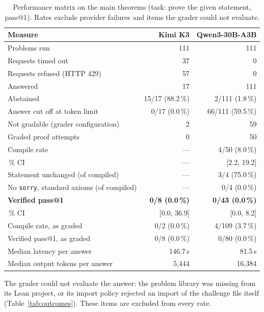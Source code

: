\documentclass[11pt]{article}
\begin{document}
\begin{table}[!htbp]
\centering
\begin{threeparttable}
\caption{Performance matrix on the main theorems (task: prove the given statement, pass@1). Rates exclude provider failures and items the grader could not evaluate.}
\label{tab:matrix}
\small
\begin{tabular}{@{}lrr@{}}
\toprule
Measure & Kimi K3 & Qwen3-30B-A3B \\
\midrule
Problems run & 111 & 111 \\
Requests timed out & 37 & 0 \\
Requests refused (HTTP 429) & 57 & 0 \\
Answered & 17 & 111 \\
Abstained\tnote{b} & 15/17 (88.2\,\%) & 2/111 (1.8\,\%) \\
Answer cut off at token limit & 0/17 (0.0\,\%) & 66/111 (59.5\,\%) \\
Not gradable (grader configuration)\tnote{a} & 2 & 59 \\
Graded proof attempts & 0 & 50 \\
\midrule
Compile rate\tnote{c} & --- & 4/50 (8.0\,\%) \\
\quad 95\,\% CI & --- & [2.2, 19.2] \\
Statement unchanged (of compiled) & --- & 3/4 (75.0\,\%) \\
No \texttt{sorry}, standard axioms (of compiled) & --- & 0/4 (0.0\,\%) \\
\textbf{Verified pass@1}\tnote{d} & \textbf{0/8 (0.0\,\%)} & \textbf{0/43 (0.0\,\%)} \\
\quad 95\,\% CI & [0.0, 36.9] & [0.0, 8.2] \\
\midrule
Compile rate, as graded\tnote{e} & 0/2 (0.0\,\%) & 4/109 (3.7\,\%) \\
Verified pass@1, as graded\tnote{e} & 0/8 (0.0\,\%) & 0/80 (0.0\,\%) \\
\midrule
Median latency per answer & 146.7\,s & 81.5\,s \\
Median output tokens per answer & 5{,}444 & 16{,}384 \\
\bottomrule
\end{tabular}
\begin{tablenotes}\footnotesize
\item[a] The grader could not evaluate the answer: the problem library was missing from its Lean project, or its import policy rejected an import of the challenge file itself (Table~\ref{tab:outcomes}). These items are excluded from every rate.

\end{tablenotes}
\end{threeparttable}
\end{table}
\end{document}

